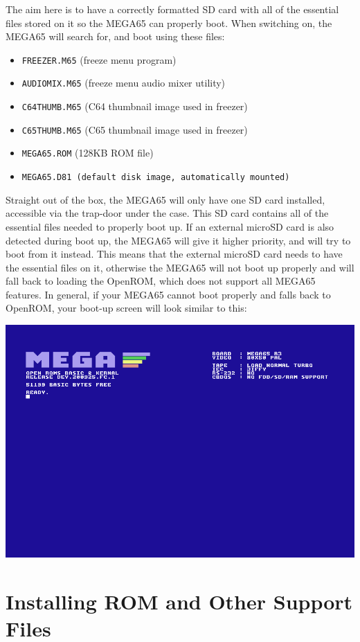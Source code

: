 The aim here is to have a correctly formatted SD card with all of the essential files stored on it so the MEGA65 can properly boot.
When switching on, the MEGA65 will search for, and boot using these files:
\begin{itemize}
\item {\tt FREEZER.M65} (freeze menu program)
\item {\tt AUDIOMIX.M65} (freeze menu audio mixer utility)
\item {\tt C64THUMB.M65} (C64 thumbnail image used in freezer)
\item {\tt C65THUMB.M65} (C65 thumbnail image used in freezer)
\item {\tt MEGA65.ROM}   (128KB ROM file)
\item {\tt MEGA65.D81 (default disk image, automatically mounted)}
\end{itemize}

Straight out of the box, the MEGA65 will only have one SD card installed, accessible via the trap-door under the case. This SD card contains all of the essential files needed to properly boot up.
If an external microSD card is also detected during boot up, the MEGA65 will give it higher priority, and will try to boot from it instead.
This means that the external microSD card needs to have the essential files on it, otherwise the MEGA65 will not boot up properly and will fall back to loading the OpenROM, which does not support all MEGA65 features.
In general, if your MEGA65 cannot boot properly and falls back to OpenROM, your boot-up screen will look similar to this:

\begin{center}
\includegraphics[width=0.7\linewidth]{images/mega65_OpenROM_boot_noSD.png}
\end{center}


\section{Installing ROM and Other Support Files}
\label{sec:installingrometc}

